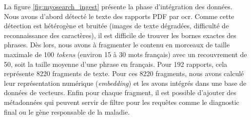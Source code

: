 La figure \ref{fig:myosearch_ingest} présente la phase d'intégration des données. Nous avons d'abord détecté le texte des rapports PDF par \gls{ocr}. Comme cette détection est hétérogène et bruitée (images de texte dégradées, difficulté de reconnaissance des caractères), il est difficile de trouver les bornes exactes des phrases. Dès lors, nous avons à fragmenter le contenu en morceaux de taille maximale de 100 \textit{tokens} (environ 15 à 30 mots français) avec un recouvrement de 50, soit la taille moyenne d'une phrase en français. Pour 192 rapports, cela représente 8220 fragments de texte. Pour ces 8220 fragments, nous avons calculé leur représentation numérique (\textit{embedding}) et les avons intégrés dans une base de données de vecteurs. Enfin pour chaque fragment, il est possible d'ajouter des métadonnées qui peuvent servir de filtre pour les requêtes comme le diagnostic final ou le gène responsable de la maladie.

